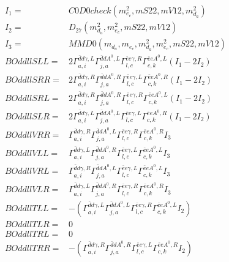 \documentclass[A4,landscape]{article}
\begin{document}
\begin{align} 
I_1 = & C0D0check(m^2_{e_{{c}}}, mS22, mV12, m^2_{d_{{a}}}) \\ 
I_2 = & D_{27}(m^2_{d_{{a}}}, m^2_{e_{{c}}}, mS22, mV12) \\ 
I_3 = & MMD0(m_{d_{{a}}}, m_{e_{{c}}}, m^2_{d_{{a}}}, m^2_{e_{{c}}}, mS22, mV12) \\ 
  BOddllSLL= & 2  \Gamma^{\bar{d}d \gamma ,L}_{a, i} \Gamma^{\bar{d}d A^0 ,L}_{j, a} \Gamma^{\bar{e}e \gamma ,R}_{l, c} \Gamma^{\bar{e}e A^0 ,L}_{c, k} (I_1 - 2 I_2) \\ 
  BOddllSRR= & 2  \Gamma^{\bar{d}d \gamma ,R}_{a, i} \Gamma^{\bar{d}d A^0 ,R}_{j, a} \Gamma^{\bar{e}e \gamma ,L}_{l, c} \Gamma^{\bar{e}e A^0 ,R}_{c, k} (I_1 - 2 I_2) \\ 
  BOddllSRL= & 2  \Gamma^{\bar{d}d \gamma ,R}_{a, i} \Gamma^{\bar{d}d A^0 ,R}_{j, a} \Gamma^{\bar{e}e \gamma ,R}_{l, c} \Gamma^{\bar{e}e A^0 ,L}_{c, k} (I_1 - 2 I_2) \\ 
  BOddllSLR= & 2  \Gamma^{\bar{d}d \gamma ,L}_{a, i} \Gamma^{\bar{d}d A^0 ,L}_{j, a} \Gamma^{\bar{e}e \gamma ,L}_{l, c} \Gamma^{\bar{e}e A^0 ,R}_{c, k} (I_1 - 2 I_2) \\ 
  BOddllVRR= &  \Gamma^{\bar{d}d \gamma ,R}_{a, i} \Gamma^{\bar{d}d A^0 ,L}_{j, a} \Gamma^{\bar{e}e \gamma ,R}_{l, c} \Gamma^{\bar{e}e A^0 ,R}_{c, k} I_3 \\ 
  BOddllVLL= &  \Gamma^{\bar{d}d \gamma ,L}_{a, i} \Gamma^{\bar{d}d A^0 ,R}_{j, a} \Gamma^{\bar{e}e \gamma ,L}_{l, c} \Gamma^{\bar{e}e A^0 ,L}_{c, k} I_3 \\ 
  BOddllVRL= &  \Gamma^{\bar{d}d \gamma ,R}_{a, i} \Gamma^{\bar{d}d A^0 ,L}_{j, a} \Gamma^{\bar{e}e \gamma ,L}_{l, c} \Gamma^{\bar{e}e A^0 ,L}_{c, k} I_3 \\ 
  BOddllVLR= &  \Gamma^{\bar{d}d \gamma ,L}_{a, i} \Gamma^{\bar{d}d A^0 ,R}_{j, a} \Gamma^{\bar{e}e \gamma ,R}_{l, c} \Gamma^{\bar{e}e A^0 ,R}_{c, k} I_3 \\ 
  BOddllTLL= & -( \Gamma^{\bar{d}d \gamma ,L}_{a, i} \Gamma^{\bar{d}d A^0 ,L}_{j, a} \Gamma^{\bar{e}e \gamma ,R}_{l, c} \Gamma^{\bar{e}e A^0 ,L}_{c, k} I_2) \\ 
  BOddllTLR= & 0 \\ 
  BOddllTRL= & 0 \\ 
  BOddllTRR= & -( \Gamma^{\bar{d}d \gamma ,R}_{a, i} \Gamma^{\bar{d}d A^0 ,R}_{j, a} \Gamma^{\bar{e}e \gamma ,L}_{l, c} \Gamma^{\bar{e}e A^0 ,R}_{c, k} I_2) \\ 
\end{align} 
\end{document}

